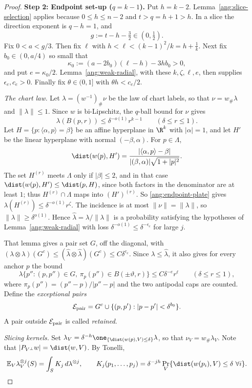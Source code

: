 \begin{proof}
\textbf{Step 2: Endpoint set-up ($q=k-1$).} Put $h=k-2$. Lemma~\ref{ang:slice-selection} applies because $0\le h\le n-2$ and $t>q=h+1>h$. In a slice the direction exponent is $q-h=1$, and
\[
 g:=t-h-\tfrac32\in(0,\tfrac12).
\]
Fix $0<a<g/3$. Then fix $\ell$ with $h<\ell<(k-1)^2/k=h+\frac1k$. Next fix $b_0\in(0,a/4)$ so small that
\[
 \kappa_0:=(a-2b_0)(\ell-h)-3hb_0>0,
\]
and put $e=\kappa_0/2$. Lemma~\ref{ang:weak-radial}, with these $k,\zeta,\ell,e$, then supplies $\epsilon_e,c_e>0$. Finally fix $\theta\in(0,1]$ with $\theta h<c_e/2$.

\emph{The chart law.} Let $\lambda=(w^{-1})_\#\nu$ be the law of chart labels, so that $\nu=w_\#\lambda$ and $\|\lambda\|\le1$. Since $w$ is bi-Lipschitz, the $q$-ball bound for $\nu$ gives
\begin{equation}\label{eq:lam-ball}
 \lambda(B(p,r))\le\delta^{-o(1)}r^{k-1}\qquad(\delta\le r\le1).
\end{equation}
Let $H=\{p:\langle\alpha,p\rangle=\beta\}$ be an affine hyperplane in $\R^k$ with $|\alpha|=1$, and let $H'$ be the linear hyperplane with normal $(-\beta,\alpha)$. For $p\in\Lambda$,
\[
 \dist(w(p),H')=\frac{|\langle\alpha,p\rangle-\beta|}{|(\beta,\alpha)|\sqrt{1+|p|^2}}.
\]
The set $H^{(r)}$ meets $\Lambda$ only if $|\beta|\le2$, and in that case $\dist(w(p),H')\le\dist(p,H)$, since both factors in the denominator are at least $1$; thus $H^{(r)}\cap\Lambda$ maps into $(H')^{(r)}$. So \eqref{ang:endpoint-plate} gives $\lambda(H^{(r)})\le\delta^{-o(1)}r^\zeta$. The incidence is at most $\|\nu\|=\|\lambda\|$, so $\|\lambda\|\ge\delta^{o(1)}$. Hence $\hat\lambda=\lambda/\|\lambda\|$ is a probability satisfying the hypotheses of Lemma~\ref{ang:weak-radial} with loss $\delta^{-o(1)}\le\delta^{-\epsilon_e}$ for large $j$.

That lemma gives a pair set $G$, off the diagonal, with $(\lambda\otimes\lambda)(G^c)\le(\hat\lambda\otimes\hat\lambda)(G^c)\le C\delta^{c_e}$. Since $\lambda\le\hat\lambda$, it also gives for every anchor $p$ the bound
\begin{equation}\label{eq:radial}
 \lambda\{p'':(p,p'')\in G,\ \pi_p(p'')\in B(\pm\vartheta,r)\}\le C\delta^{-e}r^\ell
 \qquad(\delta\le r\le1),
\end{equation}
where $\pi_p(p'')=(p''-p)/|p''-p|$ and the two antipodal caps are counted. Define the \emph{exceptional pairs}
\[
 \mathcal E_{\rm pair}=G^c\cup\{(p,p'):|p-p'|<\delta^{b_0}\}.
\]
A pair outside $\mathcal E_{\rm pair}$ is called \emph{retained}.

\emph{Slicing kernels.} Set $\lambda_V=\delta^{-h}\one_{\{\dist(w(p),V)\le\delta\}}\lambda$, so that $\nu_V=w_\#\lambda_V$. Note that $|P_{V^\perp}w|=\dist(w,V)$. By Tonelli,
\[
 \mathbb E_V\lambda_V^{\otimes j}(S)=\int_S K_j\,d\lambda^{\otimes j},\qquad
 K_j(p_1,\dots,p_j)=\delta^{-jh}\Pr_V\{\dist(w(p_i),V)\le\delta\ \forall i\}.
\]


\end{proof}
